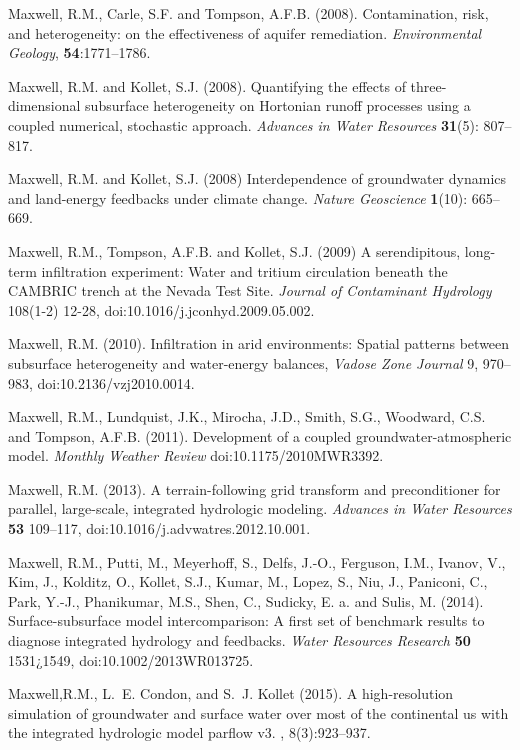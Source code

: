 \begin{thebibliography}{999}
Maxwell, R.M., Carle, S.F. and Tompson, A.F.B. (2008).
Contamination, risk, and heterogeneity: on the effectiveness of aquifer remediation. {\em Environmental Geology}, {\bf 54}:1771--1786.

Maxwell, R.M. and Kollet, S.J. (2008). Quantifying the effects of three-dimensional subsurface heterogeneity on Hortonian runoff processes using a coupled numerical, stochastic approach. {\em Advances in Water Resources} {\bf 31}(5): 807--817. 

Maxwell, R.M. and Kollet, S.J. (2008) Interdependence of groundwater dynamics and land-energy feedbacks under climate change. {\em Nature Geoscience} {\bf 1}(10): 665--669.

Maxwell, R.M., Tompson, A.F.B. and Kollet, S.J. (2009) A serendipitous, long-term infiltration experiment: Water and tritium circulation beneath the CAMBRIC trench at the Nevada Test Site. {\em Journal of Contaminant Hydrology} 108(1-2) 12-28, doi:10.1016/j.jconhyd.2009.05.002.

Maxwell, R.M. (2010). Infiltration in arid environments: Spatial patterns between subsurface heterogeneity and water-energy balances, {\em Vadose Zone Journal} 9, 970--983, doi:10.2136/vzj2010.0014.

Maxwell, R.M., Lundquist, J.K., Mirocha, J.D., Smith, S.G., Woodward, C.S. and Tompson, A.F.B. (2011). Development of a coupled groundwater-atmospheric model. {\em Monthly Weather Review} doi:10.1175/2010MWR3392.

Maxwell, R.M. (2013). A terrain-following grid transform and preconditioner for parallel, large-scale, integrated hydrologic modeling. {\em Advances in Water Resources} {\bf 53} 109--117, doi:10.1016/j.advwatres.2012.10.001. 

Maxwell, R.M., Putti, M., Meyerhoff, S., Delfs, J.-O., Ferguson, I.M., Ivanov, V., Kim, J., Kolditz, O., Kollet, S.J., Kumar, M., Lopez, S., Niu, J., Paniconi, C., Park, Y.-J., Phanikumar, M.S., Shen, C., Sudicky, E. a. and Sulis, M. (2014). Surface-subsurface model intercomparison: A first set of benchmark results to diagnose integrated hydrology and feedbacks. {\em Water Resources Research} {\bf 50} 1531¿1549, doi:10.1002/2013WR013725.

	Maxwell,R.M., L.~E. Condon, and S.~J. Kollet (2015).
\newblock A high-resolution simulation of groundwater and surface water over
  most of the continental us with the integrated hydrologic model parflow v3.
, 8(3):923--937.


\end{thebibliography}
